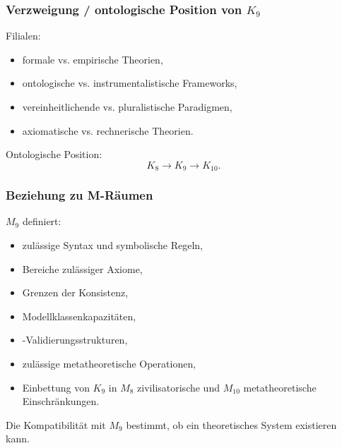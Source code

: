 \subsubsection{Verzweigung / ontologische Position von \texorpdfstring{$K_9$}{K_9}}

Filialen:
\begin{itemize}
    \item formale vs. empirische Theorien,
    \item ontologische vs. instrumentalistische Frameworks,
    \item vereinheitlichende vs. pluralistische Paradigmen,
    \item axiomatische vs. rechnerische Theorien.
\end{itemize}

Ontologische Position:
\[
K_8 \to K_9 \to K_{10}.
\]

\subsubsection{Beziehung zu M-Räumen}

$M_9$ definiert:
\begin{itemize}
    \item zulässige Syntax und symbolische Regeln,
    \item Bereiche zulässiger Axiome,
    \item Grenzen der Konsistenz,
    \item Modellklassenkapazitäten,
    \item-Validierungsstrukturen,
    \item zulässige metatheoretische Operationen,
    \item Einbettung von $K_9$ in $M_8$ zivilisatorische und $M_{10}$ metatheoretische Einschränkungen.
\end{itemize}

Die Kompatibilität mit $M_9$ bestimmt, ob ein theoretisches System existieren kann.
